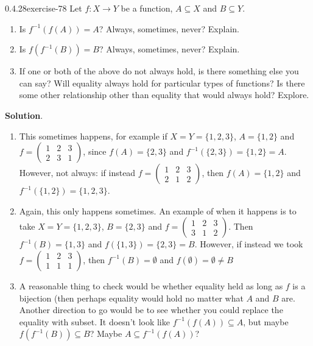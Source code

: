 \documentclass[twoside,11pt,]{book}
\numberwithin{equation}{chapter}
\newcommand{\inv}{^{-1}}
\newcommand{\twoline}[2]{\begin{pmatrix}#1 \\ #2 \end{pmatrix}}
\newcommand{\amp}{&}
\begin{document}
\begin{divisionsolution}{0.4.28}{}{exercise-78}%
\hypertarget{p-1160}{}%
Let \(f:X \to Y\) be a function, \(A \subseteq X\) and \(B \subseteq Y\).\leavevmode%
\begin{enumerate}[label=(\alph*)]
\item\hypertarget{li-921}{}\hypertarget{p-1161}{}%
Is \(f\inv\left(f(A)\right) = A\)? Always, sometimes, never? Explain.%
\item\hypertarget{li-922}{}\hypertarget{p-1162}{}%
Is \(f\left(f\inv(B)\right) = B\)? Always, sometimes, never? Explain.%
\item\hypertarget{li-923}{}\hypertarget{p-1163}{}%
If one or both of the above do not always hold, is there something else you can say? Will equality always hold for particular types of functions? Is there some other relationship other than equality that would always hold? Explore.%
\end{enumerate}
%
\par\smallskip%
\noindent\textbf{Solution}.\quad%
\hypertarget{p-1164}{}%
\leavevmode%
\begin{enumerate}[label=(\alph*)]
\item\hypertarget{li-924}{}\hypertarget{p-1165}{}%
This sometimes happens, for example if \(X = Y = \{1,2,3\}\), \(A = \{1,2\}\) and \(f = \twoline{1 \amp 2 \amp 3}{2 \amp 3 \amp 1}\), since \(f(A) = \{2,3\}\) and \(f\inv(\{2,3\}) = \{1, 2\} = A\). However, not always: if instead \(f = \twoline{1\amp 2 \amp 3}{2 \amp 1 \amp 2}\), then \(f(A) = \{1,2\}\) and \(f\inv(\{1,2\}) = \{1,2,3\}\).%
\item\hypertarget{li-925}{}\hypertarget{p-1166}{}%
Again, this only happens sometimes. An example of when it happens is to take \(X = Y = \{1,2,3\}\), \(B = \{2,3\}\) and \(f = \twoline{1\amp 2 \amp 3}{3\amp 1 \amp 2}\). Then \(f\inv(B) = \{1,3\}\) and \(f(\{1,3\}) = \{2, 3\} = B\). However, if instead we took \(f = \twoline{1 \amp 2 \amp 3}{1 \amp 1 \amp 1}\), then \(f\inv(B) = \emptyset\) and \(f(\emptyset) = \emptyset \ne B\)%
\item\hypertarget{li-926}{}\hypertarget{p-1167}{}%
A reasonable thing to check would be whether equality held as long as \(f\) is a bijection (then perhaps equality would hold no matter what \(A\) and \(B\) are. Another direction to go would be to see whether you could replace the equality with subset. It doesn't look like \(f\inv(f(A)) \subseteq A\), but maybe \(f(f\inv(B)) \subseteq B\)? Maybe \(A \subseteq f\inv (f(A))\)?%
\end{enumerate}
%
\end{divisionsolution}%
\end{document}
